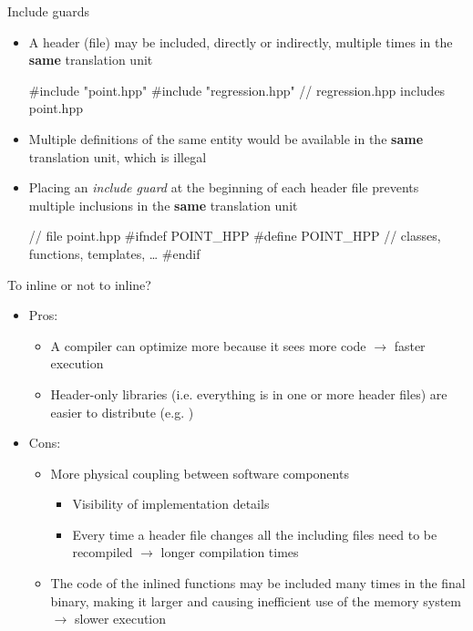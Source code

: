 \begin{frame}[fragile]{Include guards}

  \begin{itemize}[<+->]
  \item A header (file) may be included, directly or indirectly, multiple times
    in the \textbf{same} translation unit
    \begin{codeblock}
#include "point.hpp"
#include "regression.hpp" // regression.hpp includes point.hpp\end{codeblock}

  \item Multiple definitions of the same entity would be available in the
    \textbf{same} translation unit, which is illegal
  \item Placing an \textit{include guard} at the beginning of each header file
    prevents multiple inclusions in the \textbf{same} translation unit
    \begin{codeblock}
// file point.hpp
#ifndef POINT_HPP
#define POINT_HPP
\ddd
// classes, functions, templates, \ldots
\ddd
#endif\end{codeblock}
  \end{itemize}
\end{frame}

\begin{frame}{To inline or not to inline?}

  \begin{itemize}
  \item Pros:
    \begin{itemize}
    \item A compiler can optimize more because it sees more code $\rightarrow$
      faster execution
    \item Header-only libraries (i.e. everything is in one or more header files)
      are easier to distribute (e.g. )
    \end{itemize}
  \item Cons:
    \begin{itemize}
    \item More physical coupling between software components
      \begin{itemize}
      \item Visibility of implementation details
      \item Every time a header file changes all the including files need to be
        recompiled $\rightarrow$ longer compilation times
      \end{itemize}
    \item The code of the inlined functions may be included many times in the
      final binary, making it larger and causing inefficient use of the memory
      system $\rightarrow$ slower execution
    \end{itemize}
  \end{itemize}

\end{frame}
